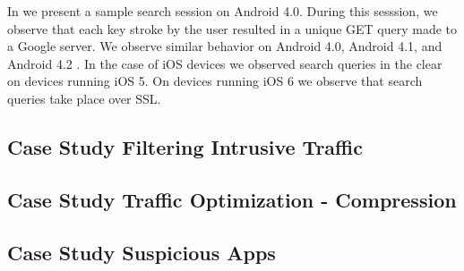 In  we present a sample search session on
Android 4.0. During this sesssion, we observe that each key stroke by
the user resulted in a unique GET query made to a Google server. We
observe similar behavior on Android 4.0, Android 4.1, and Android 4.2
. In the case of iOS devices we observed search queries
in the clear on devices running iOS 5. On devices running iOS 6 we
observe that search queries take place over SSL. 


\subsection{Case Study Filtering Intrusive Traffic}
\label{sec:case-study-filtering}

\subsection{Case Study Traffic Optimization - Compression}
\label{sec:case-study-compression}

\subsection{Case Study Suspicious Apps}
\label{sec:case-study-susp}









 




